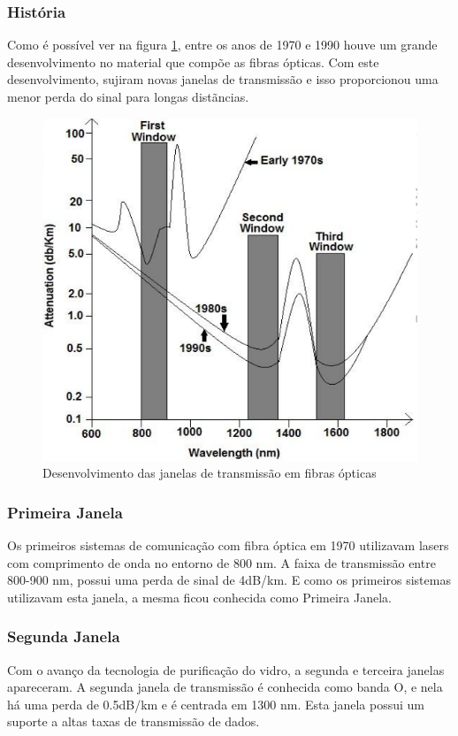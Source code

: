 \documentclass[article]{IEEEtran}
\begin{document}
\subsubsection{História}
Como é possível ver na figura \ref{fig:hist-window}, entre os anos de 1970 e 1990 houve um grande desenvolvimento no material que compõe as fibras ópticas. Com este desenvolvimento, sujiram novas janelas de transmissão e isso proporcionou uma menor perda do sinal para longas distãncias.
\begin{figure}[h]
\label{fig:hist-window}
\includegraphics[width=\columnwidth]{hist-windows.png}
\caption{Desenvolvimento das janelas de transmissão em fibras ópticas}
\end{figure}


\subsubsection{Primeira Janela}
Os primeiros sistemas de comunicação com fibra óptica em 1970 utilizavam lasers com comprimento de onda no entorno de 800 nm.
A faixa de transmissão entre 800-900 nm, possui uma perda de sinal de 4dB/km. E como os primeiros sistemas utilizavam esta janela, a mesma ficou conhecida como Primeira Janela.
\subsubsection{Segunda Janela}
Com o avanço da tecnologia de purificação do vidro, a segunda  e terceira janelas apareceram. A segunda janela de transmissão é conhecida como banda O, e nela há uma perda de 0.5dB/km e é centrada em 1300 nm. Esta janela possui um suporte a altas taxas de transmissão de dados.
\end{document}
